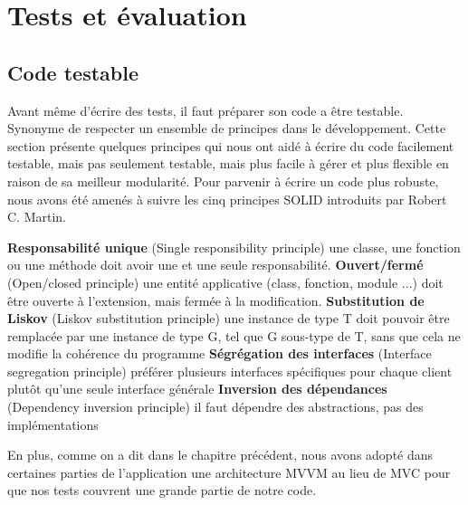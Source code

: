 \chapter{Tests et évaluation}

\section{Code testable} %
\label{sub:code_testable}
Avant même d'écrire des tests, il faut préparer son code a être testable. Synonyme de respecter un ensemble de principes dans le développement.\newline
Cette section présente quelques principes qui nous ont aidé à écrire du code facilement testable, mais pas seulement testable, mais plus facile à gérer et plus flexible en raison de sa meilleur modularité.\newline
Pour parvenir à écrire un code plus robuste, nous avons été amenés à suivre les cinq principes SOLID \cite{solid}introduits par Robert C. Martin.\cite{martin2002agile}
\begin{itemize}
	\itemb \textbf{Responsabilité unique} (Single responsibility principle)
	une classe, une fonction ou une méthode doit avoir une et une seule responsabilité.
	\itemb \textbf{Ouvert/fermé} (Open/closed principle)
	une entité applicative (class, fonction, module ...) doit être ouverte à l'extension, mais fermée à la modification.
	\itemb \textbf{Substitution de Liskov} (Liskov substitution principle)
	une instance de type T doit pouvoir être remplacée par une instance de type G, tel que G sous-type de T,
	sans que cela ne modifie la cohérence du programme
	\itemb \textbf{Ségrégation des interfaces} (Interface segregation principle)
	préférer plusieurs interfaces spécifiques pour chaque client plutôt qu'une seule interface générale
	\itemb \textbf{Inversion des dépendances} (Dependency inversion principle)
	il faut dépendre des abstractions, pas des implémentations
\end{itemize}
En plus, comme on a dit dans le chapitre précédent, nous avons adopté dans certaines parties de l'application une architecture MVVM au lieu de MVC pour que nos tests couvrent une grande partie de notre code.

